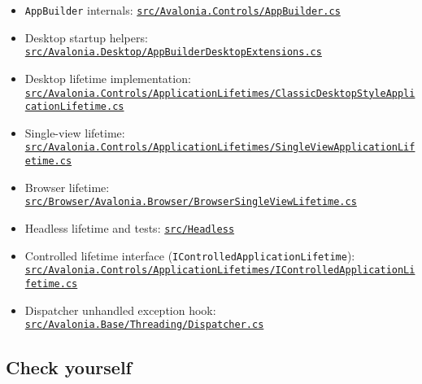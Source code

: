 \begin{itemize}
\tightlist
\item
  \passthrough{\lstinline!AppBuilder!} internals:
  \href{https://github.com/AvaloniaUI/Avalonia/blob/master/src/Avalonia.Controls/AppBuilder.cs}{\passthrough{\lstinline!src/Avalonia.Controls/AppBuilder.cs!}}
\item
  Desktop startup helpers:
  \href{https://github.com/AvaloniaUI/Avalonia/blob/master/src/Avalonia.Desktop/AppBuilderDesktopExtensions.cs}{\passthrough{\lstinline!src/Avalonia.Desktop/AppBuilderDesktopExtensions.cs!}}
\item
  Desktop lifetime implementation:
  \href{https://github.com/AvaloniaUI/Avalonia/blob/master/src/Avalonia.Controls/ApplicationLifetimes/ClassicDesktopStyleApplicationLifetime.cs}{\passthrough{\lstinline!src/Avalonia.Controls/ApplicationLifetimes/ClassicDesktopStyleApplicationLifetime.cs!}}
\item
  Single-view lifetime:
  \href{https://github.com/AvaloniaUI/Avalonia/blob/master/src/Avalonia.Controls/ApplicationLifetimes/SingleViewApplicationLifetime.cs}{\passthrough{\lstinline!src/Avalonia.Controls/ApplicationLifetimes/SingleViewApplicationLifetime.cs!}}
\item
  Browser lifetime:
  \href{https://github.com/AvaloniaUI/Avalonia/blob/master/src/Browser/Avalonia.Browser/BrowserSingleViewLifetime.cs}{\passthrough{\lstinline!src/Browser/Avalonia.Browser/BrowserSingleViewLifetime.cs!}}
\item
  Headless lifetime and tests:
  \href{https://github.com/AvaloniaUI/Avalonia/tree/master/src/Headless}{\passthrough{\lstinline!src/Headless!}}
\item
  Controlled lifetime interface
  (\passthrough{\lstinline!IControlledApplicationLifetime!}):
  \href{https://github.com/AvaloniaUI/Avalonia/blob/master/src/Avalonia.Controls/ApplicationLifetimes/IControlledApplicationLifetime.cs}{\passthrough{\lstinline!src/Avalonia.Controls/ApplicationLifetimes/IControlledApplicationLifetime.cs!}}
\item
  Dispatcher unhandled exception hook:
  \href{https://github.com/AvaloniaUI/Avalonia/blob/master/src/Avalonia.Base/Threading/Dispatcher.cs}{\passthrough{\lstinline!src/Avalonia.Base/Threading/Dispatcher.cs!}}
\end{itemize}

\subsection{Check yourself}\label{check-yourself-2}

